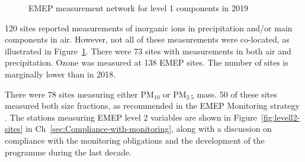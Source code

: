 \begin{figure}[h!]
 \centering
\caption{\label{fig:EMEP-measurement-network}EMEP measurement network for level 1 components in 2019}
\end{figure}

120 sites reported measurements of inorganic ions in precipitation and/or main components in air. However, not all of these measurements were co-located, as illustrated in Figure~\ref{fig:EMEP-measurement-network}. There were 73 sites with measurements in both air and precipitation.  Ozone was measured at 138 EMEP sites. The number of sites is marginally lower than in 2018.

There were 78 sites measuring either PM$_{10}$ or PM$_{2.5}$ mass. 50 of these sites measured both size fractions, as recommended in the EMEP Monitoring strategy \citep{MonStrat2019}. The stations measuring EMEP level 2 variables are shown in Figure~\ref{fig:levell2-sites} in Ch~\ref{sec:Compliance-with-monitoring}, along with a discussion on compliance with the monitoring obligations and the development of the programme during the last decade.


